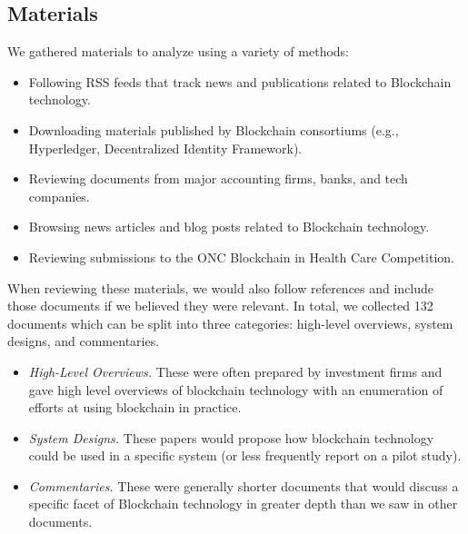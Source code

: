 \subsection{Materials}
We gathered materials to analyze using a variety of methods:

\begin{itemize}
	\item Following RSS feeds that track news and publications related to 
	Blockchain technology.%
	\item Downloading materials published by Blockchain consortiums (e.g., 
	Hyperledger, Decentralized Identity Framework).%
	\item Reviewing documents from major accounting firms, banks, and tech companies.
	\item Browsing news articles and blog posts related to Blockchain technology.%
	\item Reviewing submissions to the ONC Blockchain in Health Care Competition.
\end{itemize}

When reviewing these materials, we would also follow references and include those documents if we believed they were relevant. In total, we collected 132 documents which can be split into three categories: high-level overviews, system designs, and commentaries.

\begin{itemize}
	\item \emph{High-Level Overviews.} These were often prepared by investment firms and gave high level overviews of blockchain technology with an enumeration of efforts at using blockchain in practice.
	\item \emph{System Designs.} These papers would propose how blockchain technology could be used in a specific system (or less frequently report on a pilot study).
	\item \emph{Commentaries.} These were generally shorter documents that would discuss a specific facet of Blockchain technology in greater depth than we saw in other documents.
\end{itemize}

